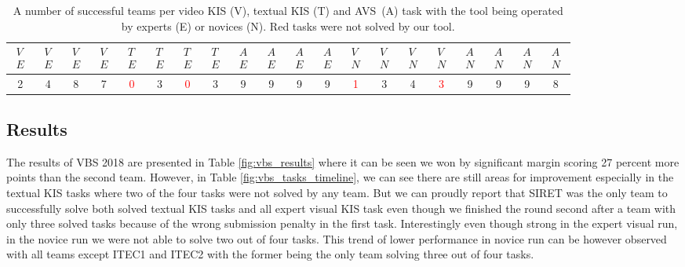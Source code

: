 \begin{table}[b!]
	\centering
	\begin{tabular}{cccc|cccc|cccc|cccc|cccc}
		\toprule
		$\substack{V \\ E}$ & $\substack{V \\ E}$ & $\substack{V \\ E}$ & $\substack{V \\ E}$ & $\substack{T \\ E}$ & $\substack{T \\ E}$ & $\substack{T \\ E}$ & $\substack{T \\ E}$ & $\substack{A \\ E}$ & $\substack{A \\ E}$ & $\substack{A \\ E}$ & $\substack{A \\ E}$ & $\substack{V \\ N}$ & $\substack{V \\ N}$ & $\substack{V \\ N}$ & $\substack{V \\ N}$ & $\substack{A \\ N}$ & $\substack{A \\ N}$ & $\substack{A \\ N}$ & $\substack{A \\ N}$ \\
		\midrule
		2 & 4 & 8 & 7 & \textcolor{red}{0} & 3 & \textcolor{red}{0} & 3 & 9 & 9 & 9 & 9 & \textcolor{red}{1} & 3 & 4 & \textcolor{red}{3} & 9 & 9 & 9 & 8 \\
		\bottomrule
	\end{tabular}
	
	\caption[Number of successful teams per task at VBS 2018]{A number of successful teams per video KIS (V), textual KIS (T) and AVS~(A) task with the tool being operated by experts (E) or novices (N). Red tasks were not solved by our tool.}
	\label{fig:vbs_tasks}
\end{table}

\subsection{Results}
The results of VBS 2018 are presented in Table \ref{fig:vbs_results} where it can be seen we won by significant margin scoring 27 percent more points than the second team. However, in Table \ref{fig:vbs_tasks_timeline}, we can see there are still areas for improvement especially in the textual KIS tasks where two of the four tasks were not solved by any team. But we can proudly report that SIRET was the only team to successfully solve both solved textual KIS tasks and all expert visual KIS task even though we finished the round second after a team with only three solved tasks because of the wrong submission penalty in the first task. Interestingly even though strong in the expert visual run, in the novice run we were not able to solve two out of four tasks. This trend of lower performance in novice run can be however observed with all teams except ITEC1 and ITEC2 with the former being the only team solving three out of four tasks.


